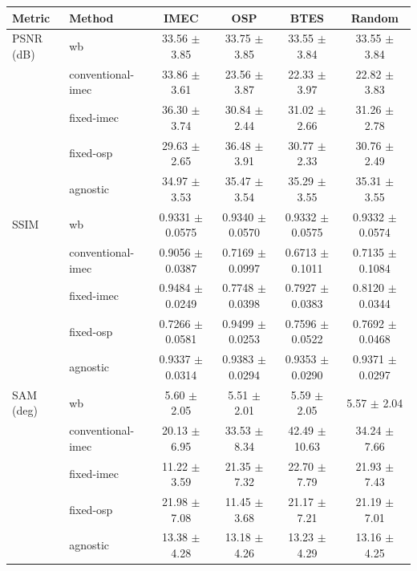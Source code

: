 \begin{tabular}{llcccc}
\hline
Metric & Method & IMEC & OSP & BTES & Random \\
\hline
PSNR (dB) & wb & 33.56 $\pm$ 3.85 & 33.75 $\pm$ 3.85 & 33.55 $\pm$ 3.84 & 33.55 $\pm$ 3.84 \\
 & conventional-imec & 33.86 $\pm$ 3.61 & 23.56 $\pm$ 3.87 & 22.33 $\pm$ 3.97 & 22.82 $\pm$ 3.83 \\
 & fixed-imec & 36.30 $\pm$ 3.74 & 30.84 $\pm$ 2.44 & 31.02 $\pm$ 2.66 & 31.26 $\pm$ 2.78 \\
 & fixed-osp & 29.63 $\pm$ 2.65 & 36.48 $\pm$ 3.91 & 30.77 $\pm$ 2.33 & 30.76 $\pm$ 2.49 \\
 & agnostic & 34.97 $\pm$ 3.53 & 35.47 $\pm$ 3.54 & 35.29 $\pm$ 3.55 & 35.31 $\pm$ 3.55 \\
\hline
SSIM & wb & 0.9331 $\pm$ 0.0575 & 0.9340 $\pm$ 0.0570 & 0.9332 $\pm$ 0.0575 & 0.9332 $\pm$ 0.0574 \\
 & conventional-imec & 0.9056 $\pm$ 0.0387 & 0.7169 $\pm$ 0.0997 & 0.6713 $\pm$ 0.1011 & 0.7135 $\pm$ 0.1084 \\
 & fixed-imec & 0.9484 $\pm$ 0.0249 & 0.7748 $\pm$ 0.0398 & 0.7927 $\pm$ 0.0383 & 0.8120 $\pm$ 0.0344 \\
 & fixed-osp & 0.7266 $\pm$ 0.0581 & 0.9499 $\pm$ 0.0253 & 0.7596 $\pm$ 0.0522 & 0.7692 $\pm$ 0.0468 \\
 & agnostic & 0.9337 $\pm$ 0.0314 & 0.9383 $\pm$ 0.0294 & 0.9353 $\pm$ 0.0290 & 0.9371 $\pm$ 0.0297 \\
\hline
SAM (deg) & wb & 5.60 $\pm$ 2.05 & 5.51 $\pm$ 2.01 & 5.59 $\pm$ 2.05 & 5.57 $\pm$ 2.04 \\
 & conventional-imec & 20.13 $\pm$ 6.95 & 33.53 $\pm$ 8.34 & 42.49 $\pm$ 10.63 & 34.24 $\pm$ 7.66 \\
 & fixed-imec & 11.22 $\pm$ 3.59 & 21.35 $\pm$ 7.32 & 22.70 $\pm$ 7.79 & 21.93 $\pm$ 7.43 \\
 & fixed-osp & 21.98 $\pm$ 7.08 & 11.45 $\pm$ 3.68 & 21.17 $\pm$ 7.21 & 21.19 $\pm$ 7.01 \\
 & agnostic & 13.38 $\pm$ 4.28 & 13.18 $\pm$ 4.26 & 13.23 $\pm$ 4.29 & 13.16 $\pm$ 4.25 \\
\hline
\end{tabular}
